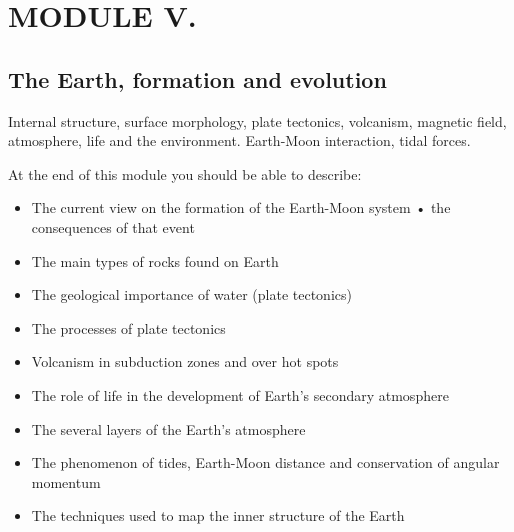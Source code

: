 \section{MODULE V.}
\subsection{The Earth, formation and evolution}

Internal structure, surface morphology, plate tectonics, volcanism, magnetic field, atmosphere, life and the environment. Earth-Moon interaction, tidal forces.

At the end of this module you should be able to describe: 
\begin{itemize}
\item The current view on the formation of the Earth-Moon system • the consequences of that event
\item The main types of rocks found on Earth
\item The geological importance of water (plate tectonics)
\item The processes of plate tectonics
\item Volcanism in subduction zones and over hot spots
\item The role of life in the development of Earth’s secondary
atmosphere
\item The several layers of the Earth’s atmosphere
\item The phenomenon of tides, Earth-Moon distance and conservation of angular momentum
\item The techniques used to map the inner structure of the Earth
\end{itemize}

